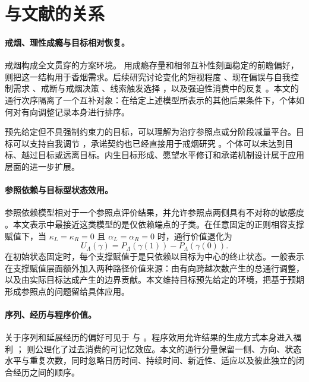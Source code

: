\section{与文献的关系}\label{sec:literature}

\paragraph{戒烟、理性成瘾与目标相对恢复。}
戒烟构成全文贯穿的方案环境。\citet{BeckerMurphy1988} 用成瘾存量和相邻互补性刻画稳定的前瞻偏好，\citet{BeckerGrossmanMurphy1994} 则把这一结构用于香烟需求。后续研究讨论变化的短视程度 \citep{OrphanidesZervos1998}、现在偏误与自我控制需求 \citep{GruberKoszegi2001}、戒断与戒烟决策 \citep{SuranovicGoldfarbLeonard1999}、线索触发选择 \citep{BernheimRangel2004}，以及强迫性消费中的反复 \citep{Winston1980}。本文的通行次序隔离了一个互补对象：在给定上述模型所表示的其他后果条件下，个体如何对有向调整记录本身进行排序。

预先给定但不具强制约束力的目标，可以理解为治疗参照点或分阶段减量平台。目标可以支持自我调节 \citep{Hsiaw2013,KochNafziger2011}，承诺契约也已经直接用于戒烟研究 \citep{GineKarlanZinman2010}。个体可以未达到目标、越过目标或远离目标。内生目标形成、愿望水平修订和承诺机制设计属于应用层面的进一步扩展。

\paragraph{参照依赖与目标型状态效用。}
参照依赖模型相对于一个参照点评价结果，并允许参照点两侧具有不对称的敏感度 \citep{TverskyKahneman1991,KoszegiRabin2006}。本文表示中最接近这类模型的是仅依赖端点的子类。在任意固定的正则相容支撑赋值下，当 $\kappa_L=\kappa_R=0$ 且 $\alpha_L=\alpha_R=0$ 时，通行价值退化为
\[
 U_\Lambda(\gamma)=P_\Lambda(\gamma(1))-P_\Lambda(\gamma(0)).
\]
在初始状态固定时，每个支撑赋值于是只依赖以目标为中心的终止状态。一般表示在支撑赋值层面额外加入两种路径价值来源：由有向跨越次数产生的总通行调整，以及由实际目标达成产生的边界贡献。本文维持目标预先给定的环境，把基于预期形成参照点的问题留给具体应用。

\paragraph{序列、经历与程序价值。}
关于序列和延展经历的偏好可见于 \citet{LoewensteinPrelec1993} 与 \citet{VareyKahneman1992}。程序效用允许结果的生成方式本身进入福利 \citep{FreyBenzStutzer2004,FreyStutzer2005}；\citet{MinardiSavochkin2024} 则公理化了过去消费的可记忆效应。本文的通行分量保留一侧、方向、状态水平与重复次数，同时忽略日历时间、持续时间、新近性、适应以及彼此独立的闭合经历之间的顺序。

